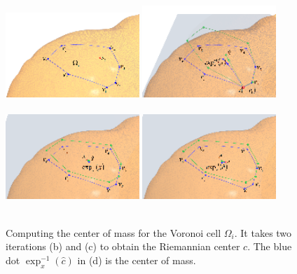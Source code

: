 \begin{figure}[htbp]
\centering
\includegraphics[width=0.45\textwidth]{figs/cvt/c_a.png}
\includegraphics[width=0.45\textwidth]{figs/cvt/c_b_new.png}\\
\\
\includegraphics[width=0.45\textwidth]{figs/cvt/c_c.png}
\includegraphics[width=0.45\textwidth]{figs/cvt/c_d.png}\\
\\
\caption{Computing the center of mass for the Voronoi cell $\Omega_i$. It takes two iterations (b) and (c) to obtain the Riemannian center $c$. The blue dot $\exp_{x}^{-1}(\hat {c})$ in (d) is the center of mass.}
\label{fig:center}
\end{figure}

